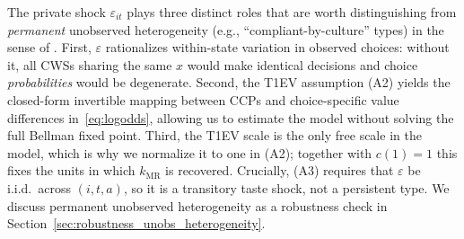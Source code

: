 The private shock $\varepsilon_{it}$ plays three distinct roles that are worth
distinguishing from \emph{permanent} unobserved heterogeneity (e.g.,
``compliant-by-culture'' types) in the sense of \citet{arcidiaconomiller2011}.
First, $\varepsilon$ rationalizes within-state variation in observed choices:
without it, all CWSs sharing the same $x$ would make identical decisions and
choice \emph{probabilities} would be degenerate. Second, the T1EV assumption
(A2) yields the closed-form invertible mapping between CCPs and
choice-specific value differences in~\eqref{eq:logodds}, allowing us to
estimate the model without solving the full Bellman fixed point. Third, the
T1EV scale is the only free scale in the model, which is why we normalize it
to one in (A2); together with $c(1) = 1$ this fixes the units in which
$k_{\text{MR}}$ is recovered. Crucially,
(A3) requires that $\varepsilon$ be i.i.d.\ across $(i, t, a)$, so it is a
transitory taste shock, not a persistent type. We discuss permanent unobserved
heterogeneity as a robustness check in
Section~\ref{sec:robustness_unobs_heterogeneity}.
